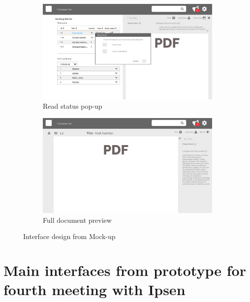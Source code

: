 \begin{figure}[H]\ContinuedFloat
	\centering
	\begin{subfigure}[b]{0.48\textwidth}
		\includegraphics[width=\textwidth]{billeder/iteration2Prototyper/Page_5.jpg}
		\caption{Read status pop-up}
		\label{fig:4-Read}
	\end{subfigure}
	\quad
	\begin{subfigure}[b]{0.48\textwidth}
		\includegraphics[width=\textwidth]{billeder/iteration2Prototyper/Page_6.jpg}
		\caption{Full document preview}
		\label{fig:4-DocPrevieFull}
	\end{subfigure}
	\caption{Interface design from Mock-up}\label{fig:4-MockUp}
\end{figure}

\section{Main interfaces from prototype for fourth meeting with Ipsen}\label{sec:2prototype}